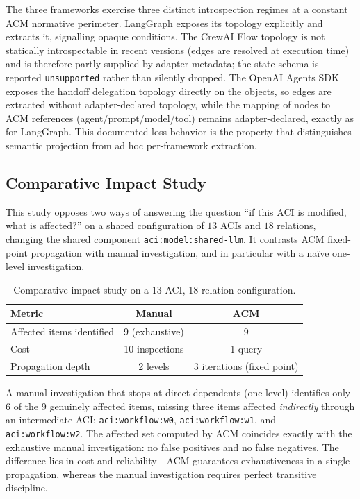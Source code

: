 \documentclass[10pt]{article}
\begin{document}
The three frameworks exercise three distinct introspection regimes at a
constant ACM normative perimeter. LangGraph exposes its topology
explicitly and extracts it, signalling opaque conditions. The CrewAI
Flow topology is not statically introspectable in recent versions
(edges are resolved at execution time) and is therefore partly supplied
by adapter metadata; the state schema is reported \texttt{unsupported}
rather than silently dropped. The OpenAI Agents SDK exposes the handoff
delegation topology directly on the objects, so edges are extracted
without adapter-declared topology, while the mapping of nodes to ACM
references (agent/prompt/model/tool) remains adapter-declared, exactly
as for LangGraph. This documented-loss behavior is the property that
distinguishes semantic projection from ad hoc per-framework extraction.

\subsection{Comparative Impact Study}
\label{app:report-impact-comparative}

This study opposes two ways of answering the question ``if this ACI is
modified, what is affected?'' on a shared configuration of $13$ ACIs and
$18$ relations, changing the shared component \texttt{aci:model:shared-llm}.
It contrasts ACM fixed-point propagation with manual investigation, and
in particular with a na\"ive one-level investigation.

\begin{table}[htbp]
	\centering
	\caption{Comparative impact study on a 13-ACI, 18-relation configuration.}
	\label{tab:app-impact-comparative}
	\small
	\begin{tabularx}{\columnwidth}{@{}Xcc@{}}
		\toprule
		\textbf{Metric} & \textbf{Manual} & \textbf{ACM} \\
		\midrule
		Affected items identified & 9 (exhaustive) & 9 \\
		Cost & 10 inspections & 1 query \\
		Propagation depth & 2 levels & 3 iterations (fixed point) \\
		\bottomrule
	\end{tabularx}
\end{table}

A manual investigation that stops at direct dependents (one level)
identifies only $6$ of the $9$ genuinely affected items, missing three
items affected \emph{indirectly} through an intermediate ACI:
\texttt{aci:workflow:w0}, \texttt{aci:workflow:w1}, and
\texttt{aci:workflow:w2}. The affected set computed by ACM coincides
exactly with the exhaustive manual investigation: no false positives and
no false negatives. The difference lies in cost and reliability---ACM
guarantees exhaustiveness in a single propagation, whereas the manual
investigation requires perfect transitive discipline.
\end{document}
